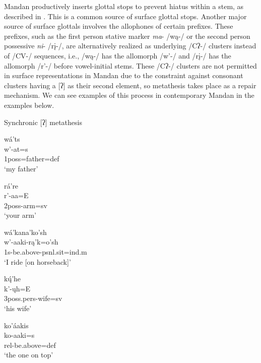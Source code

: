 Mandan productively inserts glottal stops to prevent hiatus within a stem, as described in . This is a common source of surface glottal stops. Another major source of surface glottals involves the allophones of certain prefixes. These prefixes, such as the first person stative marker \textit{ma}- /wą-/ or the second person possessive \textit{ni}- /rį-/, are alternatively realized as underlying /Cʔ-/ clusters instead of /CV-/ sequences, i.e., /wą-/ has the allomorph /w'-/ and /rį-/ has the allomorph /r'-/ before vowel-initial stems. These /Cʔ-/ clusters are not permitted in surface representations in Mandan due to the constraint against consonant clusters having a [ʔ] as their second element, so metathesis takes place as a repair mechanism. We can see examples of this process in contemporary Mandan in the examples below.



\begin{exe}

\item\label{glottalstopmetathesis1} Synchronic [ʔ] metathesis

\begin{xlist}
\item\label{glottalstopmetathesis1a}
\glll wá'ts\\
	w'-at=s\\
	1poss=\textnormal{father}=def\\
\glt	`my father'

\item\label{glottalstopmetathesis1b}
\glll rá're\\
	r'-aa=E\\
	2poss-\textnormal{arm}=sv\\
\glt	`your arm'

\item\label{glottalstopmetathesis1c}
\glll	wá'kana'ko'sh\\
	w'-aaki-rą'k=o'sh\\
	1s-\textnormal{be.above}-psnl.sit=ind.m\\
\glt	`I ride [on horseback]'

\item\label{glottalstopmetathesis1d}
\glll	kų́'he\\
	k'-ųh=E\\
	3poss.pers-\textnormal{wife}=sv\\
\glt	`his wife'

\item\label{glottalstopmetathesis1e}
\glll	ko'áakis\\
	ko-aaki=s\\
	rel-\textnormal{be.above}=def\\
\glt	`the one on top'


\end{xlist}

\end{exe}

